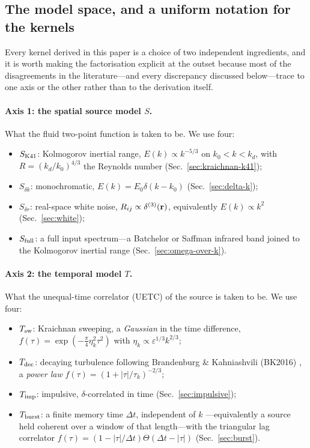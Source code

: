 \documentclass[10pt,prd,aps,nobibnotes,superscriptaddress,preprintnumbers,notitlepage]{revtex4-1}
\newcommand{\add}[1]{{\color{red}#1}}
\newcommand{\add}[1]{#1}
\newcommand{\br}{{\bf r}}
\begin{document}
\subsection{The model space, and a uniform notation for the kernels}
\label{sec:model-space}

Every kernel derived in this paper is a choice of two independent ingredients,
and it is worth making the factorisation explicit at the outset because most of
the disagreements in the literature---and every discrepancy discussed below---trace
to one axis or the other rather than to the derivation itself.

\paragraph{Axis 1: the spatial source model $S$.} What the fluid two-point
function is taken to be. We use four:
\begin{itemize}\itemsep0pt
  \item $S_{\rm K41}$: Kolmogorov inertial range, $E(k)\propto k^{-5/3}$ on
    $k_0<k<k_d$, with $R=(k_d/k_0)^{4/3}$ the Reynolds number
    (Sec.~\ref{sec:kraichnan-k41});
  \item $S_{\delta k}$: monochromatic, $E(k)=E_0\delta(k-k_0)$
    (Sec.~\ref{sec:delta-k});
  \item $S_{\delta r}$: real-space white noise, $R_{ij}\propto\delta^{(3)}(\br)$,
    equivalently $E(k)\propto k^{2}$ (Sec.~\ref{sec:white});
  \item $S_{\rm full}$: a full input spectrum---a Batchelor or Saffman infrared
    band joined to the Kolmogorov inertial range (Sec.~\ref{sec:omega-over-k}).
\end{itemize}

\paragraph{Axis 2: the temporal model $T$.} What the unequal-time correlator
(UETC) of the source is taken to be. We use four:
\begin{itemize}\itemsep0pt
  \item $T_{\rm sw}$: Kraichnan sweeping, a \emph{Gaussian} in the time
    difference, $f(\tau)=\exp(-\tfrac{\pi}{4}\eta_k^2\tau^2)$ with
    $\eta_k\propto\varepsilon^{1/3}k^{2/3}$;
  \item $T_{\rm dec}$: decaying turbulence following Brandenburg \&
    Kahniashvili (BK2016) \cite{Brandenburg:2016odr}, a \emph{power law}
    $f(\tau)=(1+|\tau|/\tau_k)^{-2/3}$;
  \item $T_{\rm imp}$: impulsive, $\delta$-correlated in time
    (Sec.~\ref{sec:impulsive});
  \item $T_{\rm burst}$: \add{a finite memory time $\Delta t$, independent of $k$
    ---equivalently a source held coherent over a window of that length---with the
    triangular lag correlator
    $f(\tau)=(1-|\tau|/\Delta t)\Theta(\Delta t-|\tau|)$} (Sec.~\ref{sec:burst}).
\end{itemize}
\end{document}

